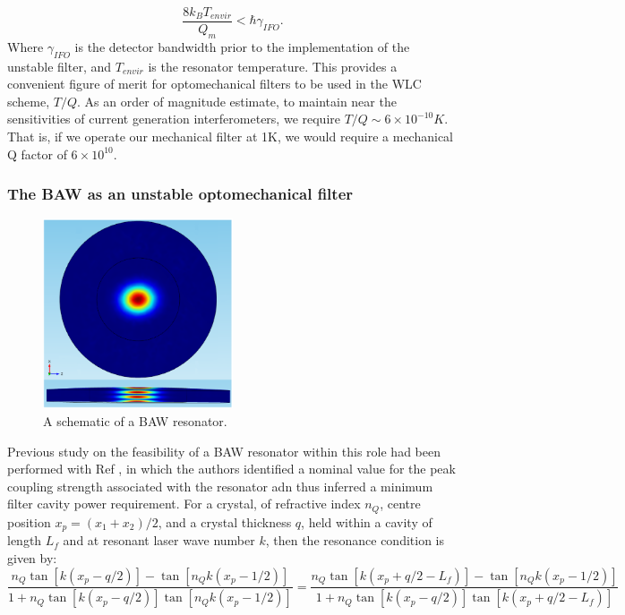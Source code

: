 \documentclass[aps,  
                a4paper, 
                amsmath, 
                amssymb, 
                preprint,
                tightenlines,  
                amsfonts,
                nofootinbib,
                onecolumn,
                titlepage,
                10pt
            ]{revtex4-2}
\begin{document}
    \begin{equation}
        \label{eq:thermal-noise}
        \frac{8k_BT_{envir}}{Q_m}<\hbar\gamma_{IFO}.
    \end{equation}
    Where $\gamma_{IFO}$ is the detector bandwidth prior to the implementation of the unstable filter, and $T_{envir}$ is the resonator temperature. This provides a convenient figure of merit for optomechanical filters to be used in the WLC scheme, $T/Q$. As an order of magnitude estimate, to maintain near the sensitivities of current generation interferometers, we require $T/Q\sim6\times10^{-10}K$. That is, if we operate our mechanical filter at 1K, we would require a mechanical Q factor of $6\times10^{10}$. 

    \subsubsection*{The BAW as an unstable optomechanical filter}
    \begin{figure}
        \centering
        \includegraphics[width=0.5\textwidth]{img/baw.png}
        \caption{A schematic of a BAW resonator\cite{galliou2016}.}
        \label{fig:baw}
    \end{figure}
    Previous study on the feasibility of a BAW resonator within this role had been performed with Ref \cite{page2021}, in which the authors identified a nominal value for the peak coupling strength associated with the resonator adn thus inferred a minimum filter cavity power requirement. For a crystal, of refractive index $n_Q$, centre position $x_p=(x_1+x_2)/2$, and a crystal thickness $q$, held within a cavity of length $L_f$ and at resonant laser wave number $k$, then the resonance condition is given by:
    \begin{equation}
        \label{eq:page-BAW-resonance-condition}
        \frac{n_Q\tan[k(x_p-q/2)]-\tan[n_Qk(x_p-1/2)]}{1+n_Q\tan[k(x_p-q/2)]\tan[n_Qk(x_p-1/2)]}=\frac{n_Q\tan[k(x_p+q/2-L_f)]-\tan[n_Qk(x_p-1/2)]}{1+n_Q\tan[k(x_p-q/2)]\tan[k(x_p+q/2-L_f)]}
    \end{equation}
\end{document}
